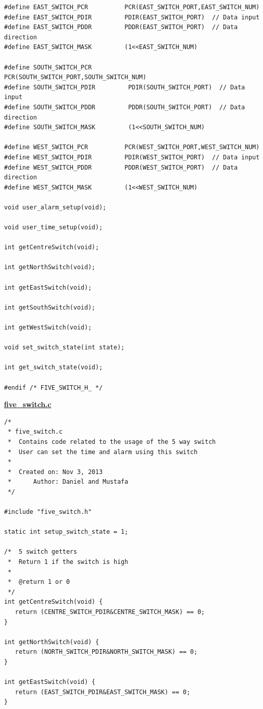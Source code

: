 \documentclass[a4paper]{article}
\begin{document}
\begin{landscape}
\begin{lstlisting}[frame=single]
#define EAST_SWITCH_PCR          PCR(EAST_SWITCH_PORT,EAST_SWITCH_NUM)
#define EAST_SWITCH_PDIR         PDIR(EAST_SWITCH_PORT)  // Data input
#define EAST_SWITCH_PDDR         PDDR(EAST_SWITCH_PORT)  // Data direction
#define EAST_SWITCH_MASK         (1<<EAST_SWITCH_NUM)

#define SOUTH_SWITCH_PCR          PCR(SOUTH_SWITCH_PORT,SOUTH_SWITCH_NUM)
#define SOUTH_SWITCH_PDIR         PDIR(SOUTH_SWITCH_PORT)  // Data input
#define SOUTH_SWITCH_PDDR         PDDR(SOUTH_SWITCH_PORT)  // Data direction
#define SOUTH_SWITCH_MASK         (1<<SOUTH_SWITCH_NUM)

#define WEST_SWITCH_PCR          PCR(WEST_SWITCH_PORT,WEST_SWITCH_NUM)
#define WEST_SWITCH_PDIR         PDIR(WEST_SWITCH_PORT)  // Data input
#define WEST_SWITCH_PDDR         PDDR(WEST_SWITCH_PORT)  // Data direction
#define WEST_SWITCH_MASK         (1<<WEST_SWITCH_NUM)

void user_alarm_setup(void);

void user_time_setup(void);

int getCentreSwitch(void);

int getNorthSwitch(void);

int getEastSwitch(void);

int getSouthSwitch(void);

int getWestSwitch(void);

void set_switch_state(int state);

int get_switch_state(void);

#endif /* FIVE_SWITCH_H_ */
\end{lstlisting}

\bf{\underline{five\_switch.c}}
\begin{lstlisting}[frame=single]
/*
 * five_switch.c
 * 	Contains code related to the usage of the 5 way switch
 * 	User can set the time and alarm using this switch
 *
 *  Created on: Nov 3, 2013
 *      Author: Daniel and Mustafa
 */

#include "five_switch.h"

static int setup_switch_state = 1;

/*	5 switch getters
 * 	Return 1 if the switch is high
 * 	
 * 	@return 1 or 0
 */
int getCentreSwitch(void) {
   return (CENTRE_SWITCH_PDIR&CENTRE_SWITCH_MASK) == 0;
}

int getNorthSwitch(void) {
   return (NORTH_SWITCH_PDIR&NORTH_SWITCH_MASK) == 0;
}

int getEastSwitch(void) {
   return (EAST_SWITCH_PDIR&EAST_SWITCH_MASK) == 0;
}


\end{lstlisting}
\end{landscape}
\end{document}
